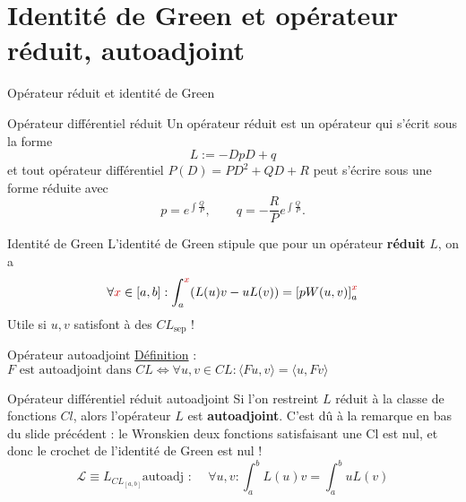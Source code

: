 \documentclass[10pt]{beamer}
\newcommand\clsep {CL_\text{sep} }
\begin{document}
\section{Identité de Green et opérateur réduit, autoadjoint}
\begin{frame}{Opérateur réduit et identité de Green}
\begin{block}{Opérateur différentiel réduit}
Un opérateur réduit est un opérateur qui s'écrit sous la forme $$L:= -DpD + q$$
et tout opérateur différentiel $P(D) = PD^2 + QD + R$ peut s'écrire sous une forme réduite avec $$ p = e^{\int \frac{Q}{P}}, \qquad q = -\frac{R}{P} e^{\int \frac{Q}{P}}.$$
\end{block}

\begin{block}{Identité de Green}
L'identité de Green stipule que pour un opérateur \textbf{réduit} $L$, on a
$$\forall \rouge{x} \in [a,b] : \int^{\rouge{x}} _{\color{black}{a}}   (L(u)v - uL(v)) = \left[pW(u,v)\right] ^{\rouge{x}} _{\color{black}{a}}  $$
Utile si $u,v$ satisfont à des $\clsep$ !
\end{block}
\end{frame}
\begin{frame}{Opérateur autoadjoint}
\underline{Définition} : $ F \text{ est autoadjoint dans $CL$} \iff  \forall u,v \in CL : \langle Fu, v \rangle = \langle u, Fv \rangle $
\begin{block}{Opérateur différentiel réduit autoadjoint}
Si l'on restreint $L$ réduit à la classe de fonctions $Cl$, alors l'opérateur $L$ est \textbf{autoadjoint}. C'est dû à la remarque en bas du slide précédent : le Wronskien deux fonctions satisfaisant une Cl est nul, et donc le crochet de l'identité de Green est nul !
$$\boxed{\mathcal{L} \equiv L_{CL_{[a,b]}} \text{autoadj : } \quad \forall u,v : \int_a ^b L(u)v = \int_a ^b uL(v)} $$
\end{block}
\end{frame}
\end{document}
